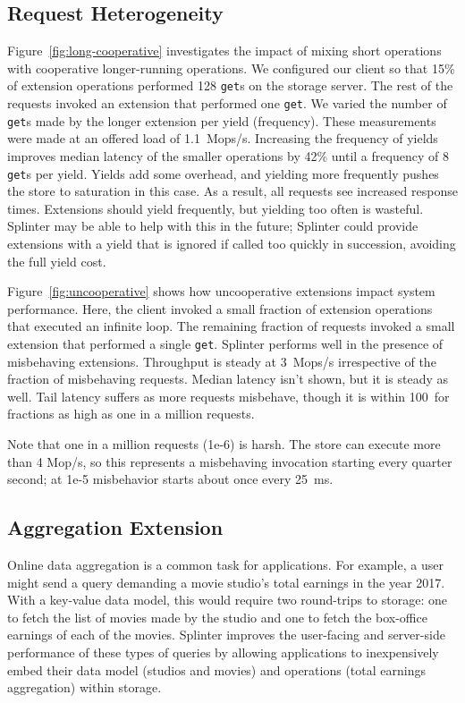 \subsection{Request Heterogeneity}

Figure~\ref{fig:long-cooperative} investigates the impact of mixing short operations
with cooperative longer-running operations.
We configured our client so that
15\% of extension operations performed
128 \texttt{get}s on the storage server. The rest of the
requests invoked an extension that performed one \texttt{get}.
We varied the number of \texttt{get}s made by the longer
extension per yield (frequency).
These measurements were made at an offered load of 1.1~Mops/s.
Increasing the frequency of yields improves median
latency of the smaller operations by 42\% until a frequency of 8 \texttt{get}s per
yield.
Yields add some overhead, and yielding more frequently pushes the store to
  saturation in this case.
As a result, all requests see increased response times.
Extensions should yield frequently, but
yielding too often is wasteful.
Splinter may be able to help with this in the future; Splinter could provide
  extensions with a yield that is ignored if called too quickly in succession,
  avoiding the full yield cost.

Figure~\ref{fig:uncooperative} shows how uncooperative
  extensions impact system performance. Here, the client invoked a
  small fraction of extension operations that executed an infinite
  loop.
The remaining fraction of requests invoked a small extension that performed a
  single \texttt{get}.
Splinter performs well in the presence of misbehaving extensions.
Throughput is steady at 3~Mops/s
  irrespective of the fraction of misbehaving requests.
Median latency isn't shown, but it is steady as well.
Tail latency suffers as more requests misbehave, though it is within
  100~\us for fractions as high as one in a million requests.

Note that one in a million requests (1e-6) is harsh.
The store can execute more than 4 Mop/s, so this represents a misbehaving
  invocation starting every quarter second; at 1e-5 misbehavior starts about once
  every 25~ms.

\subsection{Aggregation Extension}
\label{sec:eval-agg}

Online data aggregation is a common task for applications.
For example, a user might send a query
  demanding a movie studio's total earnings in the year 2017.
With a key-value data model, this would require two
  round-trips to storage:
one to fetch the list of movies made
  by the studio and one to fetch the box-office earnings of each
  of the movies.
Splinter improves the user-facing and server-side performance of these types of
  queries by allowing applications to inexpensively embed their data model
  (studios and movies) and operations (total earnings aggregation) within
  storage.


